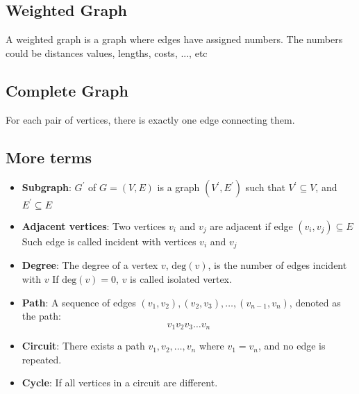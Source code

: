 \documentclass{report}
\begin{document}
\bigbreak \noindent 
\subsection{Weighted Graph}
\bigbreak \noindent 
A weighted graph is a graph where edges have assigned numbers. The numbers could be distances values, lengths, costs, ..., etc
\bigbreak \noindent 
\subsection{Complete Graph}
\bigbreak \noindent 
For each pair of vertices, there is exactly one edge connecting them.

\bigbreak \noindent 
\subsection{More terms}
\bigbreak \noindent 
\begin{itemize}
    \item \textbf{Subgraph}: $G^{\prime}$ of $G=(V,E)$ is a graph $(V^{\prime},E^{\prime})$ such that $V^{\prime}  \subseteq V$, and $E^{\prime} \subseteq E $
    \item \textbf{Adjacent vertices}: Two vertices $v_{i}$ and $v_{j}$ are adjacent if edge $(v_{i}, v_{j})  \subseteq E$
        \bigbreak \noindent 
        Such edge is called incident with vertices $v_{i}$ and $v_{j}$
    \item \textbf{Degree}: The degree of a vertex $v$, $\text{deg}(v)$, is the number of edges incident with $v$
        \bigbreak \noindent 
        If $\text{deg}(v) = 0$, $v$ is called isolated vertex.
    \item \textbf{Path}: A sequence of edges \((v_1, v_2), (v_2, v_3), \dots, (v_{n-1}, v_n)\), denoted as the path:
        \[
            v_1 v_2 v_3 \dots v_n
        \]
    \item \textbf{Circuit}: There exists a path \(v_1, v_2, \dots, v_n\) where \(v_1 = v_n\), and no edge is repeated.
    \item \textbf{Cycle}: If all vertices in a circuit are different.
\end{itemize}

\bigbreak \noindent 
\end{document}
